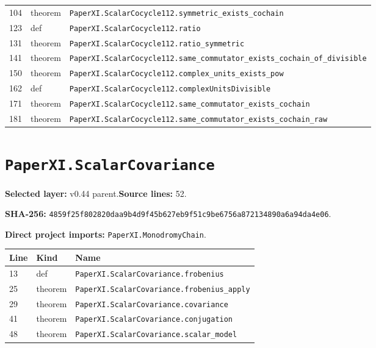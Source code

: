 \documentclass[10pt,oneside]{book}
\begin{document}
\begin{longtable}{@{}p{}p{}p{}@{}}
104&theorem&\nolinkurl{PaperXI.ScalarCocycle112.symmetric_exists_cochain}\\

123&def&\nolinkurl{PaperXI.ScalarCocycle112.ratio}\\

131&theorem&\nolinkurl{PaperXI.ScalarCocycle112.ratio_symmetric}\\

141&theorem&\nolinkurl{PaperXI.ScalarCocycle112.same_commutator_exists_cochain_of_divisible}\\

150&theorem&\nolinkurl{PaperXI.ScalarCocycle112.complex_units_exists_pow}\\

162&def&\nolinkurl{PaperXI.ScalarCocycle112.complexUnitsDivisible}\\

171&theorem&\nolinkurl{PaperXI.ScalarCocycle112.same_commutator_exists_cochain}\\

181&theorem&\nolinkurl{PaperXI.ScalarCocycle112.same_commutator_exists_cochain_raw}\\

\bottomrule\end{longtable}

\section{\texorpdfstring{\nolinkurl{PaperXI.ScalarCovariance}}{PaperXI.ScalarCovariance}}\label{module:PaperXI.ScalarCovariance}

\textbf{Selected layer:} v0.44 parent.\quad\textbf{Source lines:} 52.\par\textbf{SHA-256:} {\scriptsize\nolinkurl{4859f25f802820daa9b4d9f45b627eb9f51c9be6756a872134890a6a94da4e06}}.


\textbf{Direct project imports:} \nolinkurl{PaperXI.MonodromyChain}.

\begin{longtable}{@{}p{}p{}p{}@{}}\toprule Line&Kind&Name\\\midrule\endhead

13&def&\nolinkurl{PaperXI.ScalarCovariance.frobenius}\\

25&theorem&\nolinkurl{PaperXI.ScalarCovariance.frobenius_apply}\\

29&theorem&\nolinkurl{PaperXI.ScalarCovariance.covariance}\\

41&theorem&\nolinkurl{PaperXI.ScalarCovariance.conjugation}\\

48&theorem&\nolinkurl{PaperXI.ScalarCovariance.scalar_model}\\

\bottomrule\end{longtable}
\end{document}
